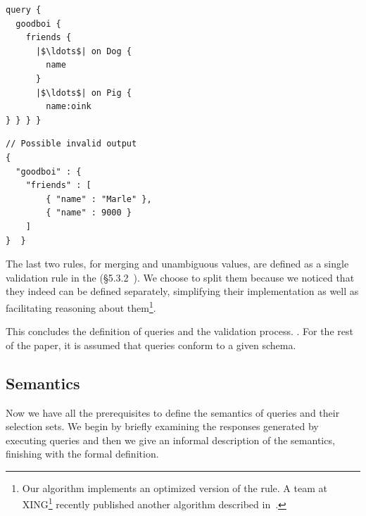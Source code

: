 \begin{minipage}[t]{.22\textwidth}
\begin{verbatim}
query {
  goodboi {
    friends {
      |$\ldots$| on Dog {
        name
      }
      |$\ldots$| on Pig {
        name:oink
} } } }
\end{verbatim}
\end{minipage}%
\begin{minipage}[t]{.22\textwidth}
\begin{verbatim}
// Possible invalid output
{
  "goodboi" : {
    "friends" : [
        { "name" : "Marle" },
        { "name" : 9000 }
    ]
}  }
\end{verbatim}
\end{minipage}


The last two rules, for merging and unambiguous values, are defined as a single validation rule in the \spec (\cf\S5.3.2~\cite{gqlspec}). 
We choose to split them because we noticed that they indeed can be defined separately, simplifying their implementation as well as facilitating 
reasoning about them\footnote{Our algorithm implements an optimized version of the rule. A team at XING\footnote{https://www.xing.com/} recently published another algorithm described in~\cite{xingalg}.}.




This concludes the definition of \gql queries and the validation process. . For the rest of the paper, it is assumed that queries conform to a given schema. 

\subsection{Semantics}\label{subsec:semantics}
Now we have all the prerequisites to define the semantics of \gql queries and their selection sets. We begin by briefly examining the responses generated by executing queries and then we give an informal description of the semantics, finishing with the formal definition. %

